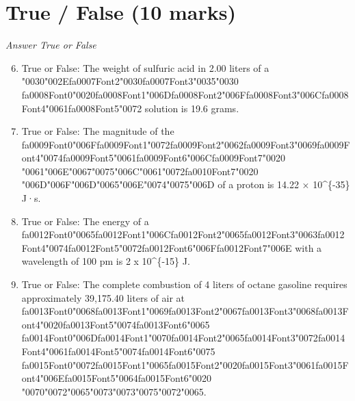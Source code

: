 \documentclass[12pt]{article}
\begin{document}
\section*{True / False (10 marks)}
\textit{Answer True or False}
\begin{enumerate}[label=\arabic*.]
\setcounter{enumi}{5}
\item True or False: The weight of sulfuric acid in 2.00 liters of a {\char"0030}{\char"002E}{\csname fa0007Font2\endcsname\char"0030}{\csname fa0007Font3\endcsname\char"0035}{\char"0030} {\csname fa0008Font0\endcsname\char"0020}{\csname fa0008Font1\endcsname\char"006D}{\csname fa0008Font2\endcsname\char"006F}{\csname fa0008Font3\endcsname\char"006C}{\csname fa0008Font4\endcsname\char"0061}{\csname fa0008Font5\endcsname\char"0072} solution is 19.6 grams.
\item True or False: The magnitude of the {\csname fa0009Font0\endcsname\char"006F}{\csname fa0009Font1\endcsname\char"0072}{\csname fa0009Font2\endcsname\char"0062}{\csname fa0009Font3\endcsname\char"0069}{\csname fa0009Font4\endcsname\char"0074}{\csname fa0009Font5\endcsname\char"0061}{\csname fa0009Font6\endcsname\char"006C}{\csname fa0009Font7\endcsname\char"0020} {\char"0061}{\char"006E}{\char"0067}{\char"0075}{\char"006C}{\char"0061}{\char"0072}{\csname fa0010Font7\endcsname\char"0020} {\char"006D}{\char"006F}{\char"006D}{\char"0065}{\char"006E}{\char"0074}{\char"0075}{\char"006D} of a proton is 14.22 × 10\^{}\{-35\} J·s.
\item True or False: The energy of a {\csname fa0012Font0\endcsname\char"0065}{\csname fa0012Font1\endcsname\char"006C}{\csname fa0012Font2\endcsname\char"0065}{\csname fa0012Font3\endcsname\char"0063}{\csname fa0012Font4\endcsname\char"0074}{\csname fa0012Font5\endcsname\char"0072}{\csname fa0012Font6\endcsname\char"006F}{\csname fa0012Font7\endcsname\char"006E} with a wavelength of 100 pm is 2 x 10\^{}\{-15\} J.
\item True or False: The complete combustion of 4 liters of octane gasoline requires approximately 39,175.40 liters of air at {\csname fa0013Font0\endcsname\char"0068}{\csname fa0013Font1\endcsname\char"0069}{\csname fa0013Font2\endcsname\char"0067}{\csname fa0013Font3\endcsname\char"0068}{\csname fa0013Font4\endcsname\char"0020}{\csname fa0013Font5\endcsname\char"0074}{\csname fa0013Font6\endcsname\char"0065} {\csname fa0014Font0\endcsname\char"006D}{\csname fa0014Font1\endcsname\char"0070}{\csname fa0014Font2\endcsname\char"0065}{\csname fa0014Font3\endcsname\char"0072}{\csname fa0014Font4\endcsname\char"0061}{\csname fa0014Font5\endcsname\char"0074}{\csname fa0014Font6\endcsname\char"0075} {\csname fa0015Font0\endcsname\char"0072}{\csname fa0015Font1\endcsname\char"0065}{\csname fa0015Font2\endcsname\char"0020}{\csname fa0015Font3\endcsname\char"0061}{\csname fa0015Font4\endcsname\char"006E}{\csname fa0015Font5\endcsname\char"0064}{\csname fa0015Font6\endcsname\char"0020} {\char"0070}{\char"0072}{\char"0065}{\char"0073}{\char"0073}{\char"0075}{\char"0072}{\char"0065}.

\end{enumerate}
\end{document}
